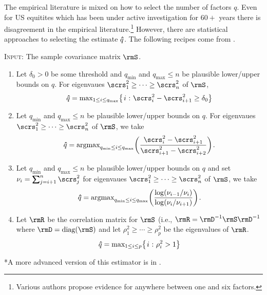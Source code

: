 \documentclass[leqno,12pt]{article}
\begin{document}
{The empirical literature is mixed on how to select the 
number of factors $q$. Even for US equitites which has
been under active investigation for $60+$ years there is 
disagreement in the empirical literature.\footnote{Various
authors propose evidence for anywhere between one and six
factors.} However, there are statistical approaches
to selecting the estimate $\bm{\hat}{q}$.  The following
recipes come from .


\begin{mdframed}[style=clean]
\textsc{Input:} The sample covariance matrix $\rmS$.
\begin{enumerate}
\item Let $\delta_0 > 0$ be some threshold and $q_{\min}$
and $q_{\max} \le n$ be plausible lower/upper bounds on $q$. 
For eigenvaues $\scrs_1^2 \ge \cdots \ge \scrs^2_n$ of $\rmS$,
\begin{align*}
  \bhat{q} = \text{max}_{1 \le i \le q_{\max}}
  \big\{ \s i \cst \scrs^2_i -\scrs^2_{i+1}  \ge \delta_0
 \big\}
\end{align*}
\item Let  $q_{\min}$
and $q_{\max} \le n$ be plausible lower/upper bounds on $q$. 
For eigenvaues $\scrs_1^2 \ge \cdots \ge \scrs^2_n$ of $\rmS$,
we take
\begin{align*}
  \bhat{q} = \text{argmax}_{q_{\min}\le i \le q_{\max}}
  \bigg(
  \frac{\scrs^2_i -\scrs^2_{i+1}}{\scrs^2_{i+1}-\scrs^2_{i+2}}
  \bigg) \s .
\end{align*}
\item Let  $q_{\min}$
and $q_{\max} \le n$ be plausible lower/upper bounds on $q$
and set $\nu_i = \sum_{j=i+1}^n \scrs^2_j$ for eigenvaues 
$\scrs_1^2 \ge \cdots \ge \scrs^2_n$ of $\rmS$,
we take
\begin{align*}
  \bm{\hat}{q} = \text{argmax}_{q_{\min} \le i \le q_{\max}}
  \bigg(
  \frac{\log (\nu_{i-1}/\nu_i)}{\log (\nu_i/\nu_{i+1})}
  \bigg) \hspace{1pt} .
\end{align*}
\item Let $\rmR$ be the correlation matrix for $\rmS$ (i.e.,
$\rmR = \rmD^{-1} \rmS \rmD^{-1}$ where $\rmD = \diag(\rmS)$
and let $\rho^2_1 \ge \cdots \ge \rho^2_p$ be the eigenvalues
of $\rmR$.
\begin{align*}
  \bm{\hat}{q} = \text{max}_{1 \le i \le p}
  \big\{ \hspace{1pt} i \hspace{0.5pt} : \hspace{0.5pt} \rho^2_i > 1 \big\}
\end{align*}
\end{enumerate}
*A more advanced version of this estimator 
is in .
\end{mdframed}

}
\end{document}
